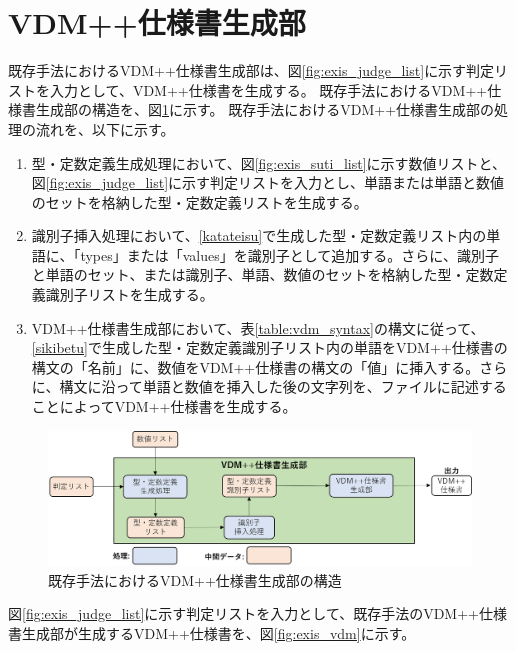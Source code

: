 \section{VDM++仕様書生成部}
既存手法におけるVDM++仕様書生成部は、図\ref{fig:exis_judge_list}に示す判定リストを入力として、VDM++仕様書を生成する。
既存手法におけるVDM++仕様書生成部の構造を、図\ref{fig:exis_generator_structure}に示す。
既存手法におけるVDM++仕様書生成部の処理の流れを、以下に示す。

\begin{enumerate}
    \item 型・定数定義生成処理において、図\ref{fig:exis_suti_list}に示す数値リストと、図\ref{fig:exis_judge_list}に示す判定リストを入力とし、単語または単語と数値のセットを格納した型・定数定義リストを生成する。
    \label{katateisu}
    \item 識別子挿入処理において、\ref{katateisu}で生成した型・定数定義リスト内の単語に、「types」または「values」を識別子として追加する。さらに、識別子と単語のセット、または識別子、単語、数値のセットを格納した型・定数定義識別子リストを生成する。
    \label{sikibetu}
    \item VDM++仕様書生成部において、表\ref{table:vdm_syntax}の構文に従って、\ref{sikibetu}で生成した型・定数定義識別子リスト内の単語をVDM++仕様書の構文の「名前」に、数値をVDM++仕様書の構文の「値」に挿入する。さらに、構文に沿って単語と数値を挿入した後の文字列を、ファイルに記述することによってVDM++仕様書を生成する。
\end{enumerate}

\begin{figure}[tp]
    \begin{center}
        \includegraphics[width=1.0\columnwidth]{image/exis_generator_structure.png}
        \caption{既存手法におけるVDM++仕様書生成部の構造}
        \label{fig:exis_generator_structure}
    \end{center}
\end{figure}

図\ref{fig:exis_judge_list}に示す判定リストを入力として、既存手法のVDM++仕様書生成部が生成するVDM++仕様書を、図\ref{fig:exis_vdm}に示す。

